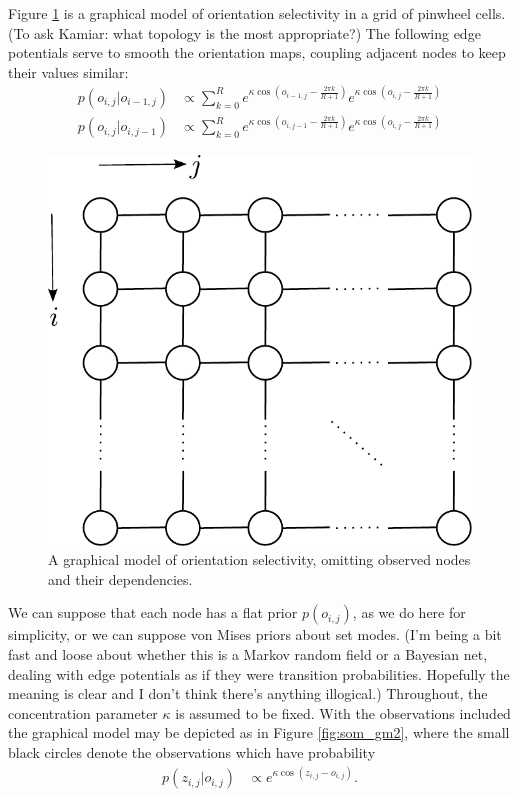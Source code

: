 \documentclass[11pt]{article}
\begin{document}
Figure \ref{fig:som_gm0} is a graphical model of orientation selectivity in a grid of pinwheel cells. (To ask Kamiar: what topology is the most appropriate?) The following edge potentials serve to smooth the orientation maps, coupling adjacent nodes to keep their values similar:
%
\begin{align*}
p(o_{i,j}|o_{i-1,j}) &\propto \sum_{k=0}^R e^{\kappa \cos\left(o_{i-1,j}-\frac{2\pi k}{R+1}\right)} e^{\kappa \cos\left(o_{i,j}-\frac{2\pi k}{R+1}\right)} \\
p(o_{i,j}|o_{i,j-1}) &\propto \sum_{k=0}^R e^{\kappa \cos\left(o_{i,j-1}-\frac{2\pi k}{R+1}\right)} e^{\kappa \cos\left(o_{i,j}-\frac{2\pi k}{R+1}\right)}
\end{align*}
%
\begin{figure}[h]
\centering
\includegraphics[scale=0.50]{../fig/col_grid_gm}
\caption{A graphical model of orientation selectivity, omitting observed nodes and their dependencies.}
\label{fig:som_gm0}
\end{figure}

\noindent We can suppose that each node has a flat prior $p(o_{i,j})$, as we do here for simplicity, or we can suppose von Mises priors about set modes. (I'm being a bit fast and loose about whether this is a Markov random field or a Bayesian net, dealing with edge potentials as if they were transition probabilities. Hopefully the meaning is clear and I don't think there's anything illogical.) Throughout, the concentration parameter $\kappa$ is assumed to be fixed. With the observations included the graphical model may be depicted as in Figure \ref{fig:som_gm2}, where the small black circles denote the observations which have probability
%
\begin{align*}
p(z_{i,j}|o_{i,j}) &\propto e^{\kappa \cos(z_{i,j}-o_{i,j})}.
\end{align*}
\end{document}
